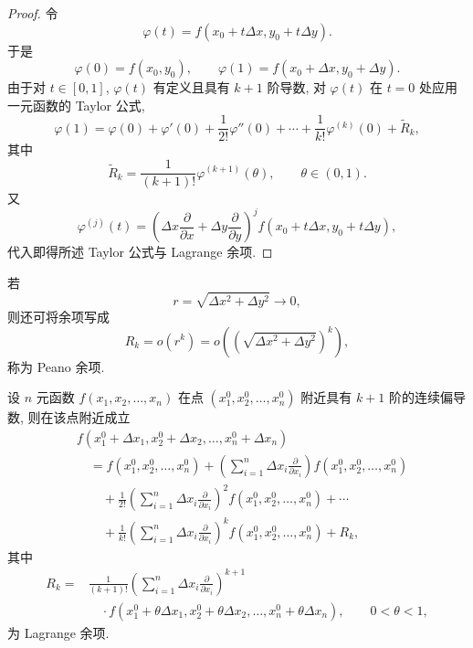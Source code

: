 \begin{proof}
	令
	\[
	\varphi(t)=f(x_0+t\Delta x,y_0+t\Delta y).
	\]
	于是
	\[
	\varphi(0)=f(x_0,y_0),
	\qquad
	\varphi(1)=f(x_0+\Delta x,y_0+\Delta y).
	\]
	由于对 $t\in[0,1]$, $\varphi(t)$ 有定义且具有 $k+1$ 阶导数,
	对 $\varphi(t)$ 在 $t=0$ 处应用一元函数的 Taylor 公式,
	\[
	\varphi(1)
	=
	\varphi(0)+\varphi'(0)
	+\frac{1}{2!}\varphi''(0)
	+\cdots+
	\frac{1}{k!}\varphi^{(k)}(0)
	+\widetilde R_k,
	\]
	其中
	\[
	\widetilde R_k
	=
	\frac{1}{(k+1)!}\varphi^{(k+1)}(\theta),
	\qquad
	\theta\in(0,1).
	\]
	又
	\[
	\varphi^{(j)}(t)
	=
	\left(
	\Delta x\frac{\partial}{\partial x}
	+\Delta y\frac{\partial}{\partial y}
	\right)^j
	f(x_0+t\Delta x,y_0+t\Delta y),
	\]
	代入即得所述 Taylor 公式与 Lagrange 余项.
\end{proof}

若
\[
r=\sqrt{\Delta x^2+\Delta y^2}\to0,
\]
则还可将余项写成
\[
R_k=o(r^k)
=o\left(\left(\sqrt{\Delta x^2+\Delta y^2}\right)^k\right),
\]
称为 Peano 余项.

\begin{theorem}
	设 $n$ 元函数 $f(x_1,x_2,\ldots,x_n)$ 在点
	$(x_1^0,x_2^0,\ldots,x_n^0)$ 附近具有 $k+1$ 阶的连续偏导数,
	则在该点附近成立
	\[
	\begin{aligned}
	&f(x_1^0+\Delta x_1,x_2^0+\Delta x_2,\ldots,x_n^0+\Delta x_n)\\
	&\quad=
	f(x_1^0,x_2^0,\ldots,x_n^0)
	+\left(
	\sum_{i=1}^n\Delta x_i\frac{\partial}{\partial x_i}
	\right)f(x_1^0,x_2^0,\ldots,x_n^0)\\
	&\qquad+
	\frac{1}{2!}
	\left(
	\sum_{i=1}^n\Delta x_i\frac{\partial}{\partial x_i}
	\right)^2 f(x_1^0,x_2^0,\ldots,x_n^0)
	+\cdots\\
	&\qquad+
	\frac{1}{k!}
	\left(
	\sum_{i=1}^n\Delta x_i\frac{\partial}{\partial x_i}
	\right)^k f(x_1^0,x_2^0,\ldots,x_n^0)
	+R_k,
	\end{aligned}
	\]
	其中
	\[
	\begin{aligned}
	R_k
	={}&
	\frac{1}{(k+1)!}
	\left(
	\sum_{i=1}^n\Delta x_i\frac{\partial}{\partial x_i}
	\right)^{k+1}\\
	&\quad\cdot
	f(x_1^0+\theta\Delta x_1,x_2^0+\theta\Delta x_2,
	\ldots,x_n^0+\theta\Delta x_n),
	\qquad 0<\theta<1,
	\end{aligned}
	\]
	为 Lagrange 余项.
\end{theorem}

